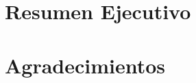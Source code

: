 \begin{preface}
\section{Resumen Ejecutivo}


\section{Agradecimientos}

\begin{flushright}
\makeatletter
	\@author
\makeatother
\end{flushright}

\tableofcontents

\listoftables

\listoffigures

\end{preface}